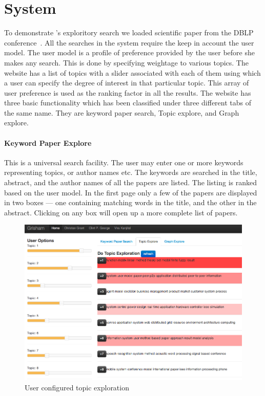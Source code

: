 
\section{System}
\label{sec:demo}


To demonstrate \system's exploritory search we loaded scientific paper from the DBLP conference~\cite{Tang:2008:EMA:1367497.1367722}.
All the searches in the system require the keep in account the user model.
The user model is a profile of preference provided by the user before she makes any search.
This is done by specifying weightage to various topics.
The \system website has a list of topics with a slider associated with each of them using which a user can specify the degree of interest in that particular topic.
This array of user preference is used as the ranking factor in all the results.
The website has three basic functionality which has been classified under three different tabs of the same name.
They are keyword paper search, Topic explore, and Graph explore. 

\paragraph{Keyword Paper Explore}
This is a universal search facility.
The user may enter one or more keywords representing topics, or author names etc.
The keywords are searched in the title, abstract, and the author names of all the papers are listed.
The listing is ranked based on the user model.
In the first page only a few of the papers are displayed in two boxes --- one containing matching words in the title, and the other in the abstract.
Clicking on any box will open up a more complete list of papers.

\begin{figure}[htb]
\includegraphics[width=.5\textwidth]{images/topic_exploration.png} %
\caption{User configured topic exploration}
\label{fig:topic_exploration}
\end{figure}

